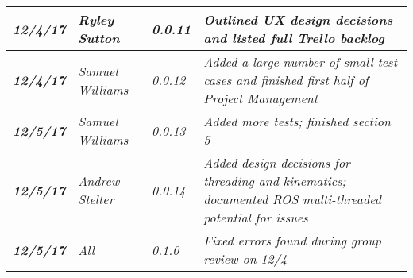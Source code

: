 \begin{tabular}{|>{\raggedright}p{1.5cm}|>{\raggedright}p{3cm}|>{\raggedright}p{1.5cm}|>{\raggedright}p{9cm}|}
\hline
\textit{\textbf{12/4/17}} & \textit{Ryley Sutton} & \textit{0.0.11} & \textit{Outlined UX design decisions and listed full Trello backlog}\tabularnewline
\hline
\textit{\textbf{12/4/17}} & \textit{Samuel Williams} & \textit{0.0.12} & \textit{Added a large number of small test cases and finished first half of Project Management}\tabularnewline
\hline
\textit{\textbf{12/5/17}} & \textit{Samuel Williams} & \textit{0.0.13} & \textit{Added more tests; finished section 5}\tabularnewline
\hline
\textit{\textbf{12/5/17}} & \textit{Andrew Stelter} & \textit{0.0.14} & \textit{Added design decisions for threading and kinematics; documented ROS multi-threaded potential for issues}\tabularnewline
\hline
\textit{\textbf{12/5/17}} & \textit{All} & \textit{0.1.0} & \textit{Fixed errors found during group review on 12/4}\tabularnewline
\hline
\end{tabular}
\vfill

